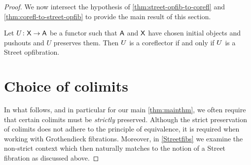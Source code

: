 \documentclass{amsart}
\begin{document}
\begin{proof}
We now intersect the hypothesis of \cref{thm:street-opfib-to-corefl} and \cref{thm:corefl-to-street-opfib} to provide the main result of this section.

\begin{thm}
  \label{thm:main-theorem-street-version}
  Let $ U \colon \mathsf{X} \to \mathsf{A} $ be a functor such that $ \mathsf{A} $ and $ \mathsf{X} $ have chosen initial objects and pushouts and $ U $ preserves them. Then $ U $ is a coreflector if and only if $ U $ is a Street opfibration.
\end{thm}





\appendix{}

\section{Choice of colimits}
\label{sec:choice_of_colimits}

In what follows, and in particular for our main \cref{thm:mainthm}, we often require that certain colimits must be \emph{strictly} preserved. Although the strict preservation of colimits does not adhere to the principle of equivalence, it is required when working with Grothendieck fibrations. Moreover, in \cref{Streetfibs} we examine the non-strict context which then naturally matches to the notion of a Street fibration as discussed above.


\end{proof}
\end{document}
